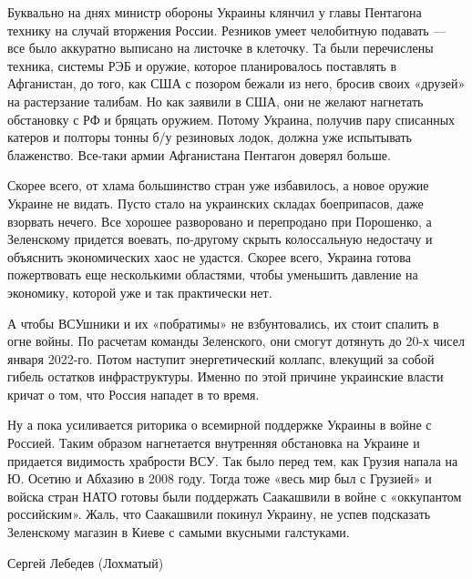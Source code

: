 Буквально на днях министр обороны Украины клянчил у главы Пентагона технику на
случай вторжения России. Резников умеет челобитную подавать — все было
аккуратно выписано на листочке в клеточку. Та были перечислены техника, системы
РЭБ и оружие, которое планировалось поставлять в Афганистан, до того, как США с
позором бежали из него, бросив своих «друзей» на растерзание талибам. Но как
заявили в США, они не желают нагнетать обстановку с РФ и бряцать оружием.
Потому Украина, получив пару списанных катеров и полторы тонны б/у резиновых
лодок, должна уже испытывать блаженство. Все-таки армии Афганистана Пентагон
доверял больше.

Скорее всего, от хлама большинство стран уже избавилось, а новое оружие Украине
не видать. Пусто стало на украинских складах боеприпасов, даже взорвать нечего.
Все хорошее разворовано и перепродано при Порошенко, а Зеленскому придется
воевать, по-другому скрыть колоссальную недостачу и объяснить экономических
хаос не удастся. Скорее всего, Украина готова пожертвовать еще несколькими
областями, чтобы уменьшить давление на экономику, которой уже и так практически
нет.

А чтобы ВСУшники и их «побратимы» не взбунтовались, их стоит спалить в огне
войны. По расчетам команды Зеленского, они смогут дотянуть до 20-х чисел января
2022-го. Потом наступит энергетический коллапс, влекущий за собой гибель
остатков инфраструктуры. Именно по этой причине украинские власти кричат о том,
что Россия нападет в то время.

Ну а пока усиливается риторика о всемирной поддержке Украины в войне с Россией.
Таким образом нагнетается внутренняя обстановка на Украине и придается
видимость храбрости ВСУ. Так было перед тем, как Грузия напала на Ю. Осетию и
Абхазию в 2008 году. Тогда тоже «весь мир был с Грузией» и войска стран НАТО
готовы были поддержать Саакашвили в войне с «оккупантом российским». Жаль, что
Саакашвили покинул Украину, не успев подсказать Зеленскому магазин в Киеве с
самыми вкусными галстуками.  

Сергей Лебедев (Лохматый)
